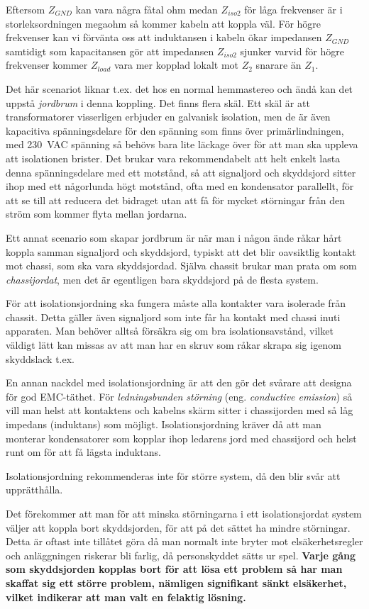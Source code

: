 Eftersom \(Z_{GND}\) kan vara några fåtal ohm medan \(Z_{iso2}\) för låga
frekvenser är i storleksordningen megaohm så kommer kabeln att koppla väl.
För högre frekvenser kan vi förvänta oss att induktansen i kabeln ökar
impedansen \(Z_{GND}\) samtidigt som kapacitansen gör att impedansen
\(Z_{iso2}\) sjunker varvid för högre frekvenser kommer \(Z_{load}\) vara mer
kopplad lokalt mot \(Z_{2}\) snarare än \(Z_{1}\).

Det här scenariot liknar t.ex. det hos en normal hemmastereo och ändå kan det
uppstå \emph{jordbrum} i denna koppling.
Det finns flera skäl.
Ett skäl är att transformatorer visserligen erbjuder en galvanisk isolation,
men de är även kapacitiva spänningsdelare för den spänning som finns över
primärlindningen, med 230~VAC spänning så behövs bara lite läckage över för att
man ska uppleva att isolationen brister.
Det brukar vara rekommendabelt att helt enkelt lasta denna spänningsdelare med
ett motstånd, så att signaljord och skyddsjord sitter ihop med ett någorlunda
högt motstånd, ofta med en kondensator parallellt, för att se till att reducera
det bidraget utan att få för mycket störningar från den ström som kommer flyta
mellan jordarna.

Ett annat scenario som skapar jordbrum är när man i någon ände råkar hårt
koppla samman signaljord och skyddsjord, typiskt att det blir oavsiktlig
kontakt mot chassi, som ska vara skyddsjordad.
Själva chassit brukar man prata om som \emph{chassijordat}, men det är
egentligen bara skyddsjord på de flesta system.

För att isolationsjordning ska fungera måste alla kontakter vara isolerade
från chassit.
Detta gäller även signaljord som inte får ha kontakt med chassi inuti apparaten.
Man behöver alltså försäkra sig om bra isolationsavstånd, vilket väldigt lätt
kan missas av att man har en skruv som råkar skrapa sig igenom skyddslack t.ex.

En annan nackdel med isolationsjordning är att den gör det svårare att designa
för god EMC-täthet.
För \emph{ledningsbunden störning} (eng. \emph{conductive emission}) så vill
man helst att kontaktens och kabelns skärm sitter i chassijorden med så låg
impedans (induktans) som möjligt.
Isolationsjordning kräver då att man monterar kondensatorer som kopplar ihop
ledarens jord med chassijord och helst runt om för att få lägsta induktans.

Isolationsjordning rekommenderas inte för större system, då den blir svår
att upprätthålla.

Det förekommer att man för att minska störningarna i ett isolationsjordat
system väljer att koppla bort skyddsjorden, för att på det sättet ha mindre
störningar.
Detta är oftast inte tillåtet göra då man normalt inte bryter mot
elsäkerhetsregler och anläggningen riskerar bli farlig, då personskyddet
sätts ur spel.
\textbf{Varje gång som skyddsjorden kopplas bort för att lösa ett problem så
  har man skaffat sig ett större problem, nämligen signifikant sänkt
  elsäkerhet, vilket indikerar att man valt en felaktig lösning.}

